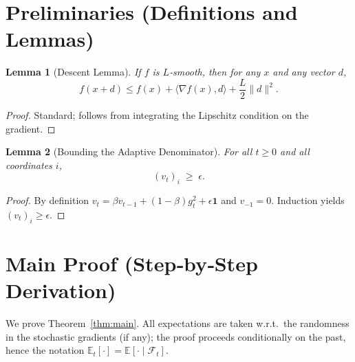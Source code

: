 \documentclass[11pt]{article}
\newtheorem{lemma}{Lemma}[section]
\begin{document}
\section*{Preliminaries (Definitions and Lemmas)}
\begin{lemma}[Descent Lemma]\label{lem:descent}
If $f$ is $L$‑smooth, then for any $x$ and any vector $d$,
\[
f(x+d)\le f(x)+\langle\nabla f(x),d\rangle+\frac{L}{2}\|d\|^2 .
\]
\end{lemma}
\begin{proof}
Standard; follows from integrating the Lipschitz condition on the gradient.
\end{proof}

\begin{lemma}[Bounding the Adaptive Denominator]\label{lem:denom}
For all $t\ge 0$ and all coordinates $i$,
\[
(v_t)_i \;\ge\; \epsilon .
\]
\end{lemma}
\begin{proof}
By definition $v_t = \beta v_{t-1}+(1-\beta)g_t^2+\epsilon\mathbf{1}$ and $v_{-1}=0$.
Induction yields $(v_t)_i\ge\epsilon$.
\end{proof}

\section*{Main Proof (Step‑by‑Step Derivation)}
We prove Theorem~\ref{thm:main}.  All expectations are taken w.r.t.\ the randomness
in the stochastic gradients (if any); the proof proceeds conditionally on the past,
hence the notation $\mathbb{E}_t[\cdot]=\mathbb{E}[\cdot\mid\mathcal{F}_t]$.
\end{document}
